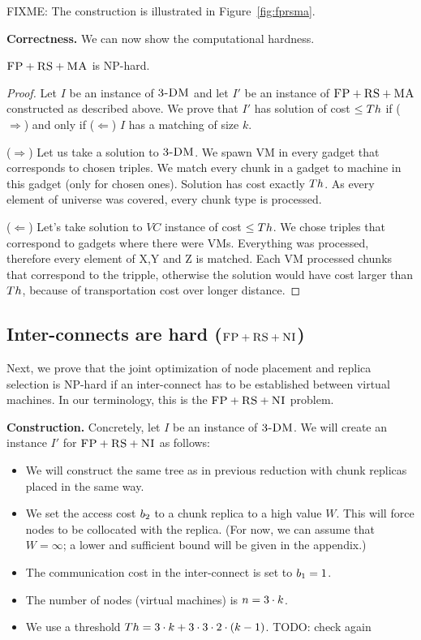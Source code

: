 FIXME: The construction is illustrated in Figure~\ref{fig:fprsma}.

\textbf{Correctness.}
We can now show the computational hardness.
\begin{theorem}
$\textsc{FP}+\textsc{RS}+\textsc{MA}$ is NP-hard.
\end{theorem}
\begin{proof}
Let $I$ be an instance of $\textsc{3-DM}$ and let $I'$ be an instance of
$\textsc{FP}+\textsc{RS}+\textsc{MA}$ constructed as described above.
We prove that $I'$ has solution of cost $\leq Th$ if ($\Rightarrow$) and only if
($\Leftarrow$)
$I$ has a matching of size $k$.

($\Rightarrow$) Let us take a solution to $\textsc{3-DM}$. We spawn VM in every
gadget that corresponds to chosen triples. We match every chunk in a
gadget to machine in this gadget (only for chosen ones). Solution has
cost exactly $Th$. As every element of universe was covered, every
chunk type is processed.

($\Leftarrow$) Let's take solution to $VC$ instance of cost $\leq Th$. We
chose triples that correspond to gadgets where there were VMs. Everything
was processed, therefore every element of X,Y and Z is matched. Each
VM processed chunks that correspond to the tripple, otherwise the
solution would have cost larger than $Th$, because of 
transportation cost over longer distance.
\end{proof}


\subsection{Inter-connects are hard ($\textsc{FP}+\textsc{RS}+\textsc{NI}$)}\label{ssec:fprscc}


Next, we prove that the joint optimization of node placement and replica selection
is NP-hard if an inter-connect has to be established between virtual machines.
In our terminology, this is the $\textsc{FP}+\textsc{RS}+\textsc{NI}$ problem.

\textbf{Construction.}
Concretely, let $I$ be an instance of $\textsc{3-DM}$. We will create an instance $I'$
for $\textsc{FP}+\textsc{RS}+\textsc{NI}$ as follows:
\begin{itemize}
\item We will construct the same tree as in previous reduction with
chunk replicas placed in the same way.
\item We set the access cost $b_2$ to a chunk replica to a high value $W$. This will force
nodes to be collocated with the replica.
(For now, we can assume that $W=\infty$; a lower and sufficient bound will be given
in the appendix.)
\item The communication cost in the inter-connect is set to $b_1 = 1$.
\item The number of nodes (virtual machines) is $n = 3 \cdot k$.
\item We use a threshold $Th =  3 \cdot k + 3 \cdot 3 \cdot 2 \cdot (k - 1)$. TODO: check again
\end{itemize}

